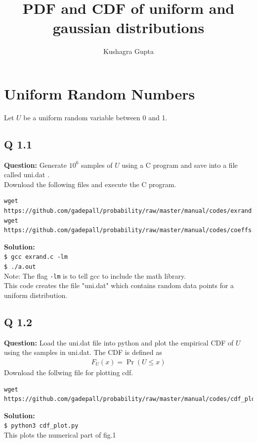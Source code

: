 \documentclass[journal,12pt,twocolumn]{IEEEtran}
\title{PDF and CDF of uniform and gaussian distributions}
\author{Kushagra Gupta}
\date{}
\providecommand{\pr}[1]{\ensuremath{\Pr\left(#1\right)}}
\begin{document}
\maketitle
\section{Uniform Random Numbers}
Let $U$ be a uniform random variable between 0 and 1.

\subsection{Q 1.1}
\noindent\textbf{Question:} Generate $10^6$ samples of $U$ using a C program and save into a file called uni.dat .\\
Download the following files and execute the  C program.
\begin{lstlisting}
wget https://github.com/gadepall/probability/raw/master/manual/codes/exrand.c
wget https://github.com/gadepall/probability/raw/master/manual/codes/coeffs.h
\end{lstlisting}
\textbf{Solution:}\\
\texttt{\$ gcc exrand.c -lm}\\
\texttt{\$ ./a.out}\\
Note: The flag \texttt{-lm} is to tell gcc to include the math library.\\ 
This code creates the file "uni.dat" which contains random data points for a uniform distribution.





\subsection{Q 1.2}
\noindent\textbf{Question:} Load the uni.dat file into python and plot the empirical CDF of $U$ using the samples in uni.dat. The CDF is defined as
\begin{align}
F_{U}(x) = \pr{U \le x}
\end{align}
Download the follwing file for plotting cdf.
\begin{lstlisting}
wget https://github.com/gadepall/probability/raw/master/manual/codes/cdf_plot.py
\end{lstlisting}
\textbf{Solution:}\\
\texttt{\$ python3 cdf\_plot.py}\\
This plots the numerical part of fig.1
\end{document}
